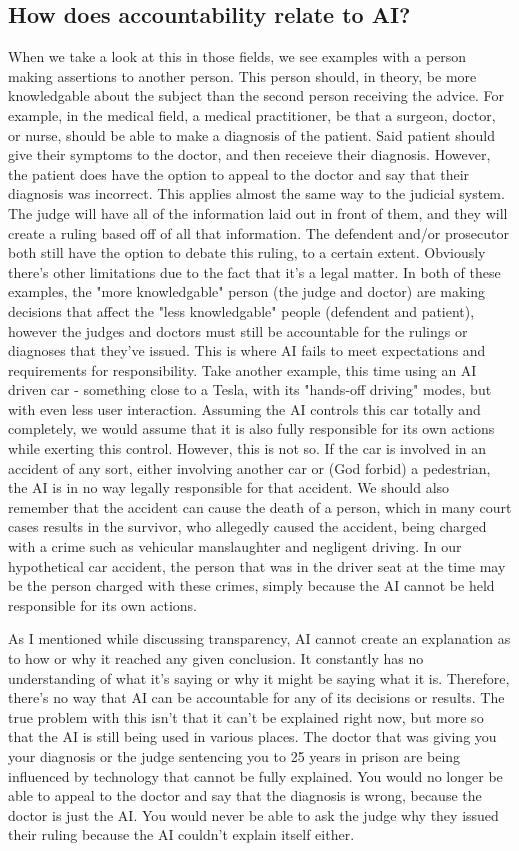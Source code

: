 \subsection{How does accountability relate to AI?}
When we take a look at this in those fields, we see examples with a person making assertions to
another person. This person should, in theory, be more knowledgable about the subject than the 
second person receiving the advice. For example, in the medical field, a medical practitioner,
be that a surgeon, doctor, or nurse, should be able to make a diagnosis of the patient. Said
patient should give their symptoms to the doctor, and then receieve their diagnosis. However,
the patient does have the option to appeal to the doctor and say that their diagnosis was
incorrect. This applies almost the same way to the judicial system. The judge will have all
of the information laid out in front of them, and they will create a ruling based off of all
that information. The defendent and/or prosecutor both still have the option to debate this
ruling, to a certain extent. Obviously there's other limitations due to the fact that it's a
legal matter. In both of these examples, the "more knowledgable" person (the judge and doctor)
are making decisions that affect the "less knowledgable" people (defendent and patient),
however the judges and doctors must still be accountable for the rulings or diagnoses that
they've issued. This is where AI fails to meet expectations and requirements for responsibility.
Take another example, this time using an AI driven car - something close to a Tesla, with its
"hands-off driving" modes, but with even less user interaction. Assuming the AI controls this
car totally and completely, we would assume that it is also fully responsible for its own
actions while exerting this control. However, this is not so. If the car is involved in an
accident of any sort, either involving another car or (God forbid) a pedestrian, the AI is in
no way legally responsible for that accident. We should also remember that the accident can
cause the death of a person, which in many court cases results in the survivor, who allegedly
caused the accident, being charged with a crime such as vehicular manslaughter and negligent
driving. In our hypothetical car accident, the person that was in the driver seat at the time
may be the person charged with these crimes, simply because the AI cannot be held responsible
for its own actions.

As I mentioned while discussing transparency, AI cannot create an explanation as to how or why
it reached any given conclusion. It constantly has no understanding of what it's saying or
why it might be saying what it is. Therefore, there's no way that AI can be accountable for 
any of its decisions or results. The true problem with this isn't that it can't be explained
right now, but more so that the AI is still being used in various places. The doctor that was
giving you your diagnosis or the judge sentencing you to 25 years in prison are being influenced
by technology that cannot be fully explained. You would no longer be able to appeal to the doctor
and say that the diagnosis is wrong, because the doctor is just the AI. You would never be able
to ask the judge why they issued their ruling because the AI couldn't explain itself either.

